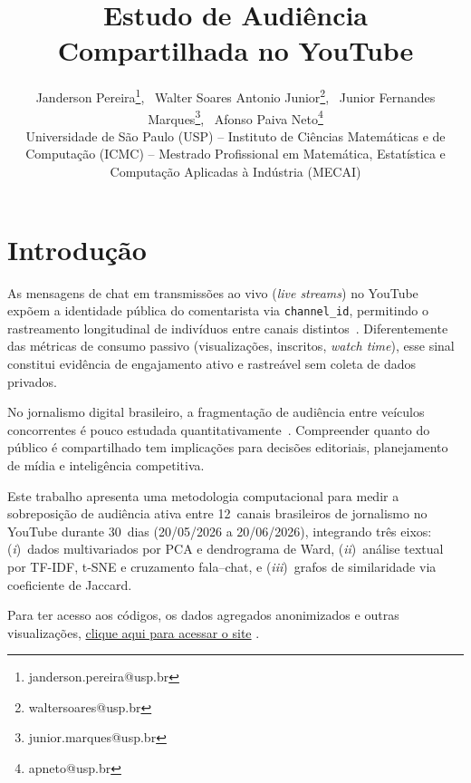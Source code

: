\documentclass[a4,11pt]{wmecai}
\begin{document}
\title{Estudo de Audiência Compartilhada no YouTube}

\author{
{\large Janderson Pereira}\thanks{janderson.pereira@usp.br},~
{\large Walter Soares Antonio Junior}\thanks{waltersoares@usp.br},~
{\large Junior Fernandes Marques}\thanks{junior.marques@usp.br},~
{\large Afonso Paiva Neto}\thanks{apneto@usp.br}\\
{\small Universidade de São Paulo (USP) -- Instituto de Ciências Matemáticas e de Computação (ICMC) -- Mestrado Profissional em Matemática, Estatística e Computação Aplicadas à Indústria (MECAI)}\\
}

\criartitulo

\section{Introdução}

As mensagens de chat em transmissões ao vivo (\textit{live streams}) no YouTube
expõem a identidade pública do comentarista via \texttt{channel\_id},
permitindo o rastreamento longitudinal de indivíduos entre canais
distintos~\cite{Hamilton2014}. Diferentemente das métricas de consumo
passivo (visualizações, inscritos, \textit{watch time}), esse sinal
constitui evidência de engajamento ativo e rastreável sem coleta de dados
privados.

No jornalismo digital brasileiro, a fragmentação de audiência entre
veículos concorrentes é pouco estudada quantitativamente~\cite{Webster2012}.
Compreender quanto do público é compartilhado tem implicações
para decisões editoriais, planejamento de mídia e inteligência competitiva.

Este trabalho apresenta uma metodologia computacional para medir a
sobreposição de audiência ativa entre 12~canais brasileiros de jornalismo
no YouTube durante 30~dias (20/05/2026 a 20/06/2026), integrando três eixos:
(\textit{i})~dados multivariados por PCA e dendrograma de Ward,
(\textit{ii})~análise textual por TF-IDF, t-SNE e cruzamento fala--chat, e
(\textit{iii})~grafos de similaridade via coeficiente de Jaccard.

Para ter acesso aos códigos, os dados agregados anonimizados e outras visualizações, \href{https://wsoaresjr.github.io/MAI5017-Visualizacao-da-Informacao}{clique aqui para acessar o site} .

\end{document}
